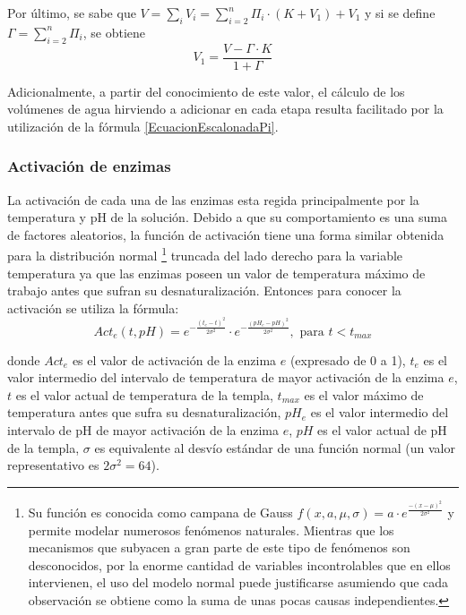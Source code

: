\begin{itemize}
                \par Por último, se sabe que $V = \sum_i V_i = \sum_{i=2}^{n} \Pi_i \cdot(K + V_1) + V_1$ y si se define $\Gamma = \sum_{i=2}^n \Pi_i$, se obtiene
                \begin{equation}
                    V_1 = \frac{V - \Gamma \cdot K}{1 + \Gamma}
                \label{EcuacionEscalonadaGamma}
                \end{equation}
                
                \par Adicionalmente, a partir del conocimiento de este valor, el cálculo de los volúmenes de agua hirviendo a adicionar en cada etapa resulta facilitado por la utilización de la fórmula \ref{EcuacionEscalonadaPi}.
            \end{itemize} %
            
        \subsubsection{Activación de enzimas}
        \par La activación de cada una de las enzimas esta regida principalmente por la temperatura y pH de la solución. Debido a que su comportamiento es una suma de factores aleatorios, la función de activación tiene una forma similar obtenida para la distribución normal \footnote{Su función es conocida como campana de Gauss $f(x,a,\mu, \sigma) = a\cdot e^{\frac{-(x - \mu)^2}{2\sigma^2}}$ y permite modelar numerosos fenómenos naturales. Mientras que los mecanismos que subyacen a gran parte de este tipo de fenómenos son desconocidos, por la enorme cantidad de variables incontrolables que en ellos intervienen, el uso del modelo normal puede justificarse asumiendo que cada observación se obtiene como la suma de unas pocas causas independientes.} truncada del lado derecho para la variable temperatura ya que las enzimas poseen un valor de temperatura máximo de trabajo antes que sufran su desnaturalización. Entonces para conocer la activación se utiliza la fórmula:
        \begin{equation}
            Act_e(t, pH) = e^{- \frac{(t_e - t)^2}{2\sigma^2}} \cdot e^{- \frac{(pH_e - pH)^2}{2\sigma^2}}, \text{ para }t< t_{max}
            \label{EcuacionActivacionEnzimas}
        \end{equation}
        \par donde $Act_e$ es el valor de activación de la enzima $e$ (expresado de 0 a 1), $t_e$ es el valor intermedio del intervalo de temperatura de mayor activación de la enzima $e$, $t$ es el valor actual de temperatura de la templa, $t_{max}$ es el valor máximo de temperatura antes que sufra su desnaturalización, $pH_e$ es el valor intermedio del intervalo de pH de mayor activación de la enzima $e$, $pH$ es el valor actual de pH de la templa, $\sigma$ es equivalente al desvío estándar de una función normal (un valor representativo es $2\sigma^2=64$). 
        
